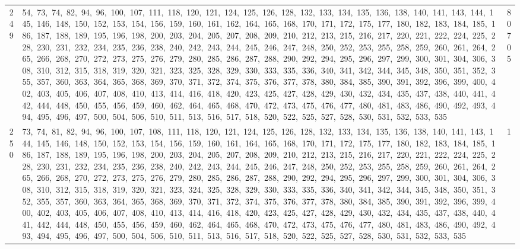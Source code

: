 \begin{longtable}{c|p{}|r}
249 & 54,\ 73,\ 74,\ 82,\ 94,\ 96,\ 100,\ 107,\ 111,\ 118,\ 120,\ 121,\ 124,\ 125,\ 126,\ 128,\ 132,\ 133,\ 134,\ 135,\ 136,\ 138,\ 140,\ 141,\ 143,\ 144,\ 145,\ 146,\ 148,\ 150,\ 152,\ 153,\ 154,\ 156,\ 159,\ 160,\ 161,\ 162,\ 164,\ 165,\ 168,\ 170,\ 171,\ 172,\ 175,\ 177,\ 180,\ 182,\ 183,\ 184,\ 185,\ 186,\ 187,\ 188,\ 189,\ 195,\ 196,\ 198,\ 200,\ 203,\ 204,\ 205,\ 207,\ 208,\ 209,\ 210,\ 212,\ 213,\ 215,\ 216,\ 217,\ 220,\ 221,\ 222,\ 224,\ 225,\ 228,\ 230,\ 231,\ 232,\ 234,\ 235,\ 236,\ 238,\ 240,\ 242,\ 243,\ 244,\ 245,\ 246,\ 247,\ 248,\ 250,\ 252,\ 253,\ 255,\ 258,\ 259,\ 260,\ 261,\ 264,\ 265,\ 266,\ 268,\ 270,\ 272,\ 273,\ 275,\ 276,\ 279,\ 280,\ 285,\ 286,\ 287,\ 288,\ 290,\ 292,\ 294,\ 295,\ 296,\ 297,\ 299,\ 300,\ 301,\ 304,\ 306,\ 308,\ 310,\ 312,\ 315,\ 318,\ 319,\ 320,\ 321,\ 323,\ 325,\ 328,\ 329,\ 330,\ 333,\ 335,\ 336,\ 340,\ 341,\ 342,\ 344,\ 345,\ 348,\ 350,\ 351,\ 352,\ 355,\ 357,\ 360,\ 363,\ 364,\ 365,\ 368,\ 369,\ 370,\ 371,\ 372,\ 374,\ 375,\ 376,\ 377,\ 378,\ 380,\ 384,\ 385,\ 390,\ 391,\ 392,\ 396,\ 399,\ 400,\ 402,\ 403,\ 405,\ 406,\ 407,\ 408,\ 410,\ 413,\ 414,\ 416,\ 418,\ 420,\ 423,\ 425,\ 427,\ 428,\ 429,\ 430,\ 432,\ 434,\ 435,\ 437,\ 438,\ 440,\ 441,\ 442,\ 444,\ 448,\ 450,\ 455,\ 456,\ 459,\ 460,\ 462,\ 464,\ 465,\ 468,\ 470,\ 472,\ 473,\ 475,\ 476,\ 477,\ 480,\ 481,\ 483,\ 486,\ 490,\ 492,\ 493,\ 494,\ 495,\ 496,\ 497,\ 500,\ 504,\ 506,\ 510,\ 511,\ 513,\ 516,\ 517,\ 518,\ 520,\ 522,\ 525,\ 527,\ 528,\ 530,\ 531,\ 532,\ 533,\ 535 & 80705 \\
250 & 73,\ 74,\ 81,\ 82,\ 94,\ 96,\ 100,\ 107,\ 108,\ 111,\ 118,\ 120,\ 121,\ 124,\ 125,\ 126,\ 128,\ 132,\ 133,\ 134,\ 135,\ 136,\ 138,\ 140,\ 141,\ 143,\ 144,\ 145,\ 146,\ 148,\ 150,\ 152,\ 153,\ 154,\ 156,\ 159,\ 160,\ 161,\ 164,\ 165,\ 168,\ 170,\ 171,\ 172,\ 175,\ 177,\ 180,\ 182,\ 183,\ 184,\ 185,\ 186,\ 187,\ 188,\ 189,\ 195,\ 196,\ 198,\ 200,\ 203,\ 204,\ 205,\ 207,\ 208,\ 209,\ 210,\ 212,\ 213,\ 215,\ 216,\ 217,\ 220,\ 221,\ 222,\ 224,\ 225,\ 228,\ 230,\ 231,\ 232,\ 234,\ 235,\ 236,\ 238,\ 240,\ 242,\ 243,\ 244,\ 245,\ 246,\ 247,\ 248,\ 250,\ 252,\ 253,\ 255,\ 258,\ 259,\ 260,\ 261,\ 264,\ 265,\ 266,\ 268,\ 270,\ 272,\ 273,\ 275,\ 276,\ 279,\ 280,\ 285,\ 286,\ 287,\ 288,\ 290,\ 292,\ 294,\ 295,\ 296,\ 297,\ 299,\ 300,\ 301,\ 304,\ 306,\ 308,\ 310,\ 312,\ 315,\ 318,\ 319,\ 320,\ 321,\ 323,\ 324,\ 325,\ 328,\ 329,\ 330,\ 333,\ 335,\ 336,\ 340,\ 341,\ 342,\ 344,\ 345,\ 348,\ 350,\ 351,\ 352,\ 355,\ 357,\ 360,\ 363,\ 364,\ 365,\ 368,\ 369,\ 370,\ 371,\ 372,\ 374,\ 375,\ 376,\ 377,\ 378,\ 380,\ 384,\ 385,\ 390,\ 391,\ 392,\ 396,\ 399,\ 400,\ 402,\ 403,\ 405,\ 406,\ 407,\ 408,\ 410,\ 413,\ 414,\ 416,\ 418,\ 420,\ 423,\ 425,\ 427,\ 428,\ 429,\ 430,\ 432,\ 434,\ 435,\ 437,\ 438,\ 440,\ 441,\ 442,\ 444,\ 448,\ 450,\ 455,\ 456,\ 459,\ 460,\ 462,\ 464,\ 465,\ 468,\ 470,\ 472,\ 473,\ 475,\ 476,\ 477,\ 480,\ 481,\ 483,\ 486,\ 490,\ 492,\ 493,\ 494,\ 495,\ 496,\ 497,\ 500,\ 504,\ 506,\ 510,\ 511,\ 513,\ 516,\ 517,\ 518,\ 520,\ 522,\ 525,\ 527,\ 528,\ 530,\ 531,\ 532,\ 533,\ 535 & 1 \\

\end{longtable}
